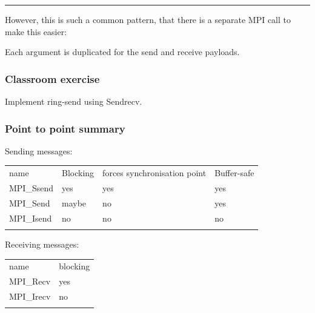 \begin{center}\rule{3in}{0.4pt}\end{center}

However, this is such a common pattern, that there is a separate MPI
call to make this easier:

\begin{Shaded}
\begin{Highlighting}[]
     
                     
\end{Highlighting}
\end{Shaded}

Each argument is duplicated for the send and receive payloads.

\subsubsection{Classroom exercise}\label{classroom-exercise}

Implement ring-send using Sendrecv.

\subsubsection{Point to point summary}\label{point-to-point-summary}

Sending messages:

\begin{longtable}[c]{@{}llll@{}}
\toprule\addlinespace
name & Blocking & forces synchronisation point & Buffer-safe
\\\addlinespace
\midrule\endhead
MPI\_Ssend & yes & yes & yes
\\\addlinespace
MPI\_Send & maybe & no & yes
\\\addlinespace
MPI\_Isend & no & no & no
\\\addlinespace
\bottomrule
\end{longtable}

Receiving messages:

\begin{longtable}[c]{@{}ll@{}}
\toprule\addlinespace
name & blocking
\\\addlinespace
\midrule\endhead
MPI\_Recv & yes
\\\addlinespace
MPI\_Irecv & no
\\\addlinespace
\bottomrule
\end{longtable}

